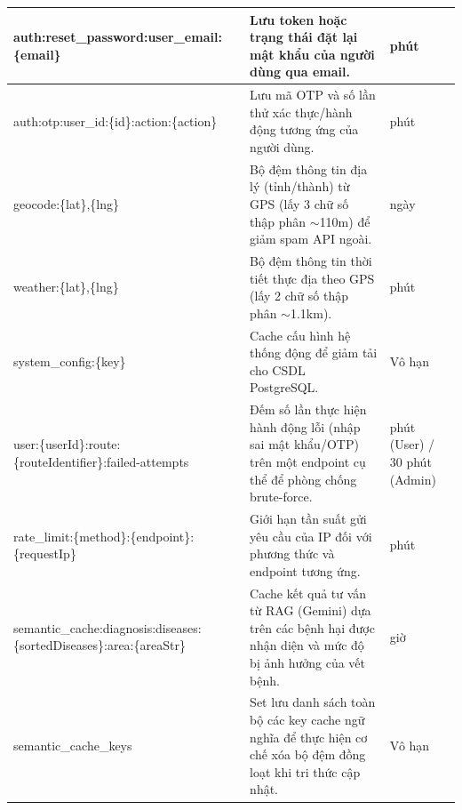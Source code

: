 \documentclass[12pt,a4paper]{article}
\begin{document}
\begin{longtable}{|>{\raggedright\arraybackslash}p{5.5cm}|>{\raggedright\arraybackslash}p{7cm}|>{\raggedright\arraybackslash}p{3cm}|}
    auth:\allowbreak reset\_password:\allowbreak user\_email:\allowbreak \{email\}                                                     & Lưu token hoặc trạng thái đặt lại mật khẩu của người dùng qua email.                                              & 10 phút                          \\
    \hline
    auth:\allowbreak otp:\allowbreak user\_id:\allowbreak \{id\}:\allowbreak action:\allowbreak \{action\}                             & Lưu mã OTP và số lần thử xác thực/hành động tương ứng của người dùng.                                             & 10 phút                          \\
    \hline
    geocode:\allowbreak \{lat\},\{lng\}                                                                                                & Bộ đệm thông tin địa lý (tỉnh/thành) từ GPS (lấy 3 chữ số thập phân $\sim$110m) để giảm spam API ngoài.           & 30 ngày                          \\
    \hline
    weather:\allowbreak \{lat\},\{lng\}                                                                                                & Bộ đệm thông tin thời tiết thực địa theo GPS (lấy 2 chữ số thập phân $\sim$1.1km).                                & 30 phút                          \\
    \hline
    system\_config:\allowbreak \{key\}                                                                                                 & Cache cấu hình hệ thống động để giảm tải cho CSDL PostgreSQL.                                                     & Vô hạn                           \\
    \hline
    user:\allowbreak \{userId\}:\allowbreak route:\allowbreak \{routeIdentifier\}:\allowbreak failed-attempts                          & Đếm số lần thực hiện hành động lỗi (nhập sai mật khẩu/OTP) trên một endpoint cụ thể để phòng chống brute-force.   & 15 phút (User) / 30 phút (Admin) \\
    \hline
    rate\_limit:\allowbreak \{method\}:\allowbreak \{endpoint\}:\allowbreak \{requestIp\}                                              & Giới hạn tần suất gửi yêu cầu của IP đối với phương thức và endpoint tương ứng.                                   & 1 phút                           \\
    \hline
    semantic\_cache:\allowbreak diagnosis:\allowbreak diseases:\allowbreak \{sortedDiseases\}:\allowbreak area:\allowbreak \{areaStr\} & Cache kết quả tư vấn từ RAG (Gemini) dựa trên các bệnh hại được nhận diện và mức độ bị ảnh hưởng của vết bệnh.    & 24 giờ                           \\
    \hline
    semantic\_cache\_keys                                                                                                              & Set lưu danh sách toàn bộ các key cache ngữ nghĩa để thực hiện cơ chế xóa bộ đệm đồng loạt khi tri thức cập nhật. & Vô hạn                           \\
    \hline
\end{longtable}
\end{document}
